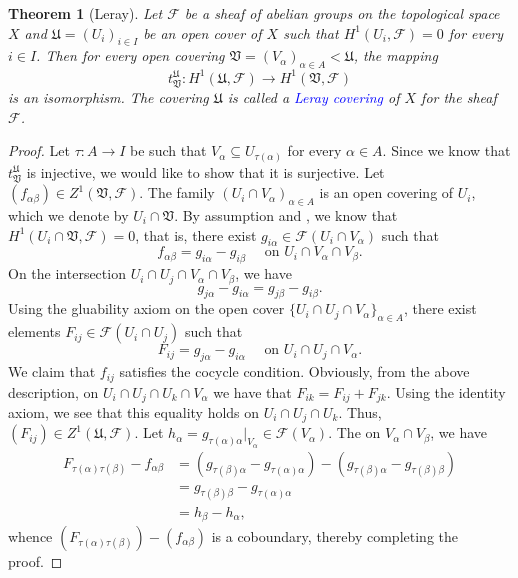 \documentclass[10pt]{article}
\theoremstyle{thmstyle}
\newtheorem{theorem}{Theorem}[section]
\theoremstyle{defstyle}
\newcommand{\frakU}{\mathfrak{U}}
\newcommand{\frakV}{\mathfrak{V}}
\newcommand{\scrF}{\mathscr{F}}
\newcommand{\define}[1]{\textcolor{blue}{\textit{#1}}}
\begin{document}
\begin{theorem}[Leray]
    Let $\scrF$ be a sheaf of abelian groups on the topological space $X$ and $\frakU = (U_i)_{i\in I}$ be an open cover of $X$ such that $H^1(U_i,\scrF) = 0$ for every $i\in I$. Then for every open covering $\frakV = (V_\alpha)_{\alpha\in A} < \frakU$, the mapping 
    \begin{equation*}
        t^{\frakU}_{\frakV} : H^1(\frakU,\scrF)\to H^1(\frakV,\scrF)
    \end{equation*}
    is an isomorphism. The covering $\frakU$ is called a \define{Leray covering} of $X$ for the sheaf $\scrF$.
\end{theorem}
\begin{proof}
    Let $\tau: A\to I$ be such that $V_\alpha\subseteq U_{\tau(\alpha)}$ for every $\alpha\in A$. Since we know that $t^{\frakU}_{\frakV}$ is injective, we would like to show that it is surjective. Let $(f_{\alpha\beta})\in Z^1(\frakV,\scrF)$. The family $(U_i\cap V_\alpha)_{\alpha\in A}$ is an open covering of $U_i$, which we denote by $U_i\cap\frakV$. By assumption and , we know that $H^1(U_i\cap\frakV,\scrF) = 0$, that is, there exist $g_{i\alpha}\in\scrF(U_i\cap V_\alpha)$ such that 
    \begin{equation*}
        f_{\alpha\beta} = g_{i\alpha} - g_{i\beta}\quad\text{ on } U_i\cap V_\alpha\cap V_\beta.
    \end{equation*}
    On the intersection $U_i\cap U_j\cap V_\alpha\cap V_\beta$, we have 
    \begin{equation*}
        g_{j\alpha} - g_{i\alpha} = g_{j\beta} - g_{i\beta}.
    \end{equation*}
    Using the gluability axiom on the open cover $\{U_i\cap U_j\cap V_\alpha\}_{\alpha\in A}$, there exist elements $F_{ij}\in\scrF(U_i\cap U_j)$ such that 
    \begin{equation*}
        F_{ij} = g_{j\alpha} - g_{i\alpha}\quad\text{ on } U_i\cap U_j\cap V_\alpha.
    \end{equation*}
    We claim that $f_{ij}$ satisfies the cocycle condition. Obviously, from the above description, on $U_i\cap U_j\cap U_k\cap V_\alpha$ we have that $F_{ik} = F_{ij} + F_{jk}$. Using the identity axiom, we see that this equality holds on $U_i\cap U_j\cap U_k$. Thus, $(F_{ij})\in Z^1(\frakU,\scrF)$. Let $h_\alpha = g_{\tau(\alpha)\alpha}|_{V_\alpha}\in\scrF(V_\alpha)$. The on $V_\alpha\cap V_\beta$, we have 
    \begin{align*}
        F_{\tau(\alpha)\tau(\beta)} - f_{\alpha\beta} &= \left(g_{\tau(\beta)\alpha} - g_{\tau(\alpha)\alpha}\right) - \left(g_{\tau(\beta)\alpha} - g_{\tau(\beta)\beta}\right)\\
        &= g_{\tau(\beta)\beta} - g_{\tau(\alpha)\alpha}\\
        &= h_\beta - h_\alpha,
    \end{align*}
    whence $(F_{\tau(\alpha)\tau(\beta)}) - (f_{\alpha\beta})$ is a coboundary, thereby completing the proof.
\end{proof}
\end{document}
